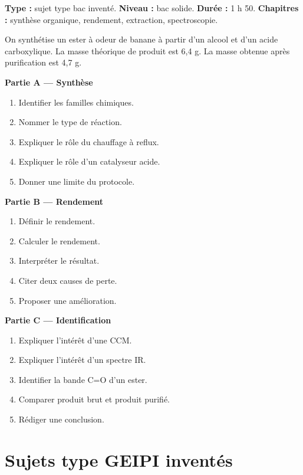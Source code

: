 \documentclass[11pt,a4paper]{article}
\begin{document}
\hypertarget{PC-LONG-08}{}
\begin{sujettype}
\textbf{Type :} sujet type bac inventé.  
\textbf{Niveau :} bac solide.  
\textbf{Durée :} 1 h 50.  
\textbf{Chapitres :} synthèse organique, rendement, extraction, spectroscopie.

On synthétise un ester à odeur de banane à partir d'un alcool et d'un acide carboxylique. La masse théorique de produit est 6,4 g. La masse obtenue après purification est 4,7 g.

\textbf{Partie A — Synthèse}
\begin{enumerate}
  \item Identifier les familles chimiques.
  \item Nommer le type de réaction.
  \item Expliquer le rôle du chauffage à reflux.
  \item Expliquer le rôle d'un catalyseur acide.
  \item Donner une limite du protocole.
\end{enumerate}

\textbf{Partie B — Rendement}
\begin{enumerate}
  \item Définir le rendement.
  \item Calculer le rendement.
  \item Interpréter le résultat.
  \item Citer deux causes de perte.
  \item Proposer une amélioration.
\end{enumerate}

\textbf{Partie C — Identification}
\begin{enumerate}
  \item Expliquer l'intérêt d'une CCM.
  \item Expliquer l'intérêt d'un spectre IR.
  \item Identifier la bande C=O d'un ester.
  \item Comparer produit brut et produit purifié.
  \item Rédiger une conclusion.
\end{enumerate}
\end{sujettype}

\section{Sujets type GEIPI inventés}
\end{document}
